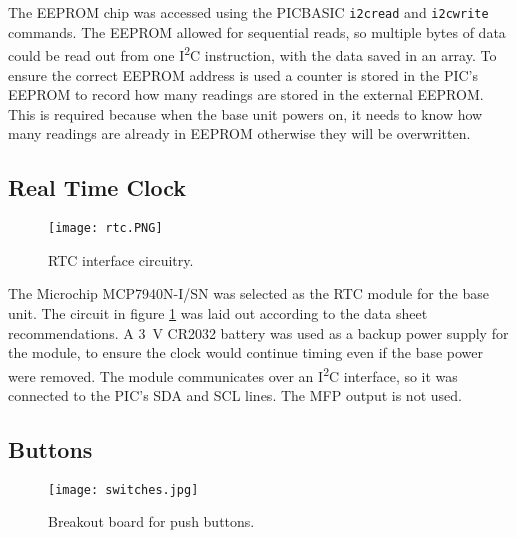 The EEPROM chip was accessed using the PICBASIC \verb|i2cread| and \verb|i2cwrite| commands. The EEPROM allowed for sequential reads, so multiple bytes of data could be read out from one I\textsuperscript{2}C instruction, with the data saved in an array. To ensure the correct EEPROM address is used a counter is stored in the PIC's EEPROM to record how many readings are stored in the external EEPROM. This is required because when the base unit powers on, it needs to know how many readings are already in EEPROM otherwise they will be overwritten.\\





\subsection{Real Time Clock}
\begin{figure}[htbp]
	\centering
	\texttt{[image: rtc.PNG]}
	\caption{RTC interface circuitry.}
	\label{fig: rtc schematic}
\end{figure}

The Microchip MCP7940N-I/SN \cite{rtc} was selected as the RTC module for the base unit. The circuit in figure \ref{fig: rtc schematic} was laid out according to the data sheet \cite{rtc} recommendations. A \SI{3}{\volt} CR2032 battery was used as a backup power supply for the module, to ensure the clock would continue timing even if the base power were removed. The module communicates over an I\textsuperscript{2}C interface, so it was connected to the PIC's SDA and SCL lines. The MFP output is not used.





\subsection{Buttons}
\begin{figure}[htbp]
	\centering
	\texttt{[image: switches.jpg]}
	\caption{Breakout board for push buttons.}
	\label{fig: buttons}
\end{figure}

